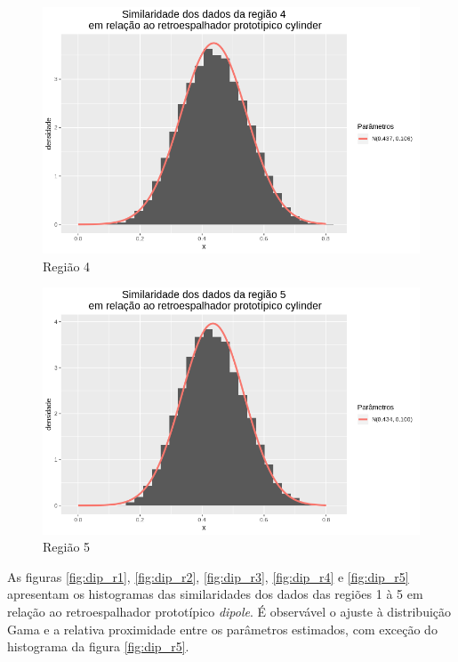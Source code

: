 \documentclass[12pt]{article}
\begin{document}
\begin{figure}[!h]
    \centering
    \vspace{0.1\linewidth}
    \includegraphics[width = \linewidth]{../../Images/Report_18_12_20/cy_region4.png}
    \caption{Região 4}
    \label{fig:cy_r4}
\end{figure}

\begin{figure}[!h]
    \centering
    \vspace{0.1\linewidth}
    \includegraphics[width = \linewidth]{../../Images/Report_18_12_20/cy_region5.png}
    \caption{Região 5}
    \label{fig:cy_r5}
\end{figure}

As figuras \ref{fig:dip_r1}, \ref{fig:dip_r2}, \ref{fig:dip_r3}, \ref{fig:dip_r4} e \ref{fig:dip_r5} apresentam os histogramas das similaridades dos dados das regiões 1 à 5 em relação ao retroespalhador prototípico \textit{dipole}. É observável o ajuste à distribuição Gama e a relativa proximidade entre os parâmetros estimados, com exceção do histograma da figura \ref{fig:dip_r5}.
\end{document}
